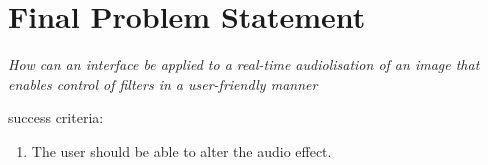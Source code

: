 \chapter{Final Problem Statement}\label{ch:finalproblem}

\textit{How can an interface be applied to a real-time audiolisation of an image that enables control of filters in a user-friendly manner}

success criteria:
\begin{enumerate}
\item The user should be able to alter the audio effect.
\end{enumerate}

